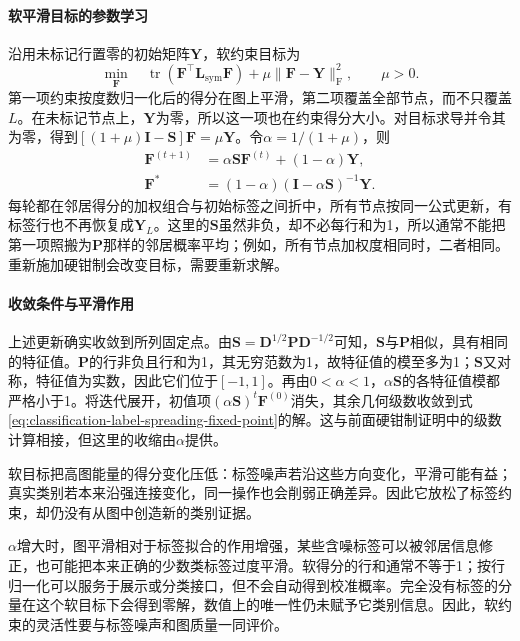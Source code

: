 \paragraph{软平滑目标的参数学习}
沿用未标记行置零的初始矩阵$\bm{Y}$，软约束目标为
\begin{equation}
  \label{eq:classification-label-spreading-objective}
  \min_{\bm{F}}\quad
    \operatorname{tr}
      (\bm{F}^{\top}\bm{L}_{\mathrm{sym}}\bm{F})
    +\mu\lVert\bm{F}-\bm{Y}\rVert_{\mathrm{F}}^2,
  \qquad \mu>0.
\end{equation}
第一项约束按度数归一化后的得分在图上平滑，第二项覆盖全部节点，而不只覆盖$L$。在未标记节点上，$\bm{Y}$为零，所以这一项也在约束得分大小。对目标求导并令其为零，得到$[(1+\mu)\bm{I}-\bm{S}]\bm{F}=\mu\bm{Y}$。令$\alpha=1/(1+\mu)$，则
\begin{equation}
  \label{eq:classification-label-spreading-fixed-point}
  \begin{aligned}
    \bm{F}^{(t+1)}
      &=\alpha\bm{S}\bm{F}^{(t)}+(1-\alpha)\bm{Y},\\
    \bm{F}^\ast
      &=(1-\alpha)(\bm{I}-\alpha\bm{S})^{-1}\bm{Y}.
  \end{aligned}
\end{equation}
每轮都在邻居得分的加权组合与初始标签之间折中，所有节点按同一公式更新，有标签行也不再恢复成$\bm{Y}_L$。这里的$\bm S$虽然非负，却不必每行和为1，所以通常不能把第一项照搬为$\bm P$那样的邻居概率平均；例如，所有节点加权度相同时，二者相同。重新施加硬钳制会改变目标，需要重新求解。

\paragraph{收敛条件与平滑作用}
上述更新确实收敛到所列固定点。由$\bm S=\bm D^{1/2}\bm P\bm D^{-1/2}$可知，$\bm S$与$\bm P$相似，具有相同的特征值。$\bm P$的行非负且行和为1，其无穷范数为1，故特征值的模至多为1；$\bm S$又对称，特征值为实数，因此它们位于$[-1,1]$。再由$0<\alpha<1$，$\alpha\bm S$的各特征值模都严格小于1。将迭代展开，初值项$(\alpha\bm S)^t\bm F^{(0)}$消失，其余几何级数收敛到式\eqref{eq:classification-label-spreading-fixed-point}的解。这与前面硬钳制证明中的级数计算相接，但这里的收缩由$\alpha$提供。

软目标把高图能量的得分变化压低：标签噪声若沿这些方向变化，平滑可能有益；真实类别若本来沿强连接变化，同一操作也会削弱正确差异。因此它放松了标签约束，却仍没有从图中创造新的类别证据。

$\alpha$增大时，图平滑相对于标签拟合的作用增强，某些含噪标签可以被邻居信息修正，也可能把本来正确的少数类标签过度平滑。软得分的行和通常不等于1；按行归一化可以服务于展示或分类接口，但不会自动得到校准概率。完全没有标签的分量在这个软目标下会得到零解，数值上的唯一性仍未赋予它类别信息。因此，软约束的灵活性要与标签噪声和图质量一同评价。

